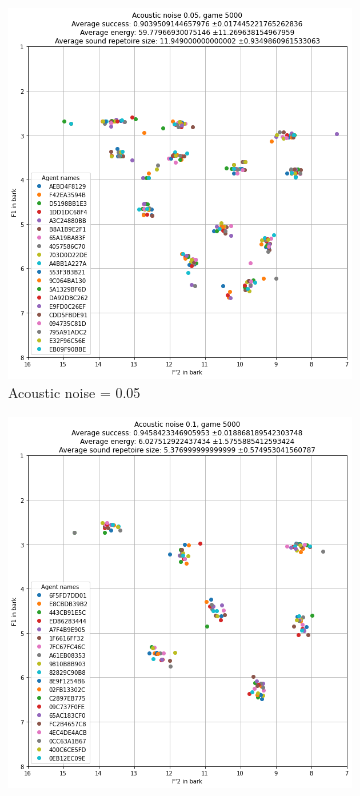 \begin{figure}[ht]
\begin{subfigure}{.30\textwidth}
        \includegraphics[width=\textwidth]{images/extra/bark_noise_2.png}
        \captionsetup{width=0.9\linewidth}
        \captionsetup{justification=centering}
        \caption{Acoustic noise = 0.05}
    \end{subfigure}
    \hspace{0.5cm}
    \begin{subfigure}{.30\textwidth}
        \centering
        \includegraphics[width=\textwidth]{images/extra/bark_noise_3.png}

\end{subfigure}
\end{figure}
